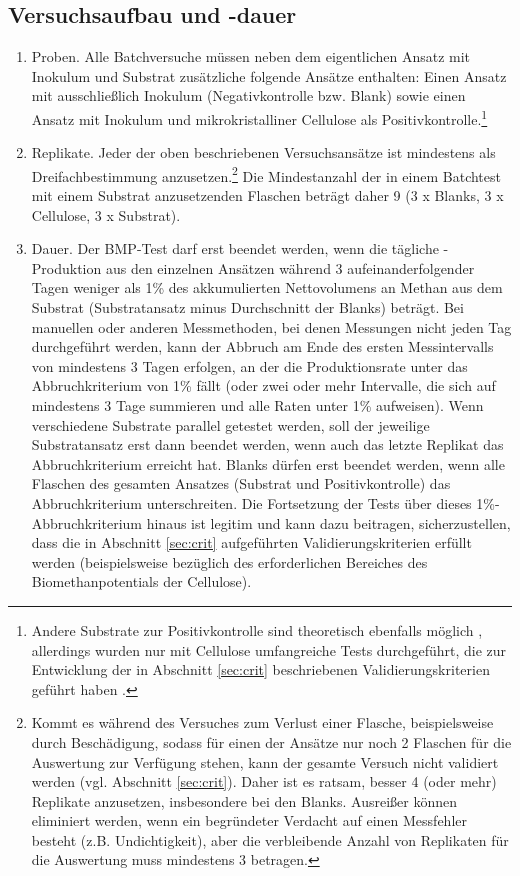 \documentclass[]{article}
\begin{document}
\subsection{Versuchsaufbau und -dauer}
\label{sec:setup}
\begin{enumerate}
  \item Proben. 
    Alle Batchversuche müssen neben dem eigentlichen Ansatz mit Inokulum und Substrat zusätzliche folgende Ansätze enthalten: Einen Ansatz mit ausschließlich Inokulum (Negativkontrolle bzw. Blank) sowie einen Ansatz mit Inokulum und mikrokristalliner Cellulose als Positivkontrolle.\footnote{
      Andere Substrate zur Positivkontrolle sind theoretisch ebenfalls möglich \citep{kochEvaluationCommonSupermarket2020}, allerdings wurden nur mit Cellulose umfangreiche Tests durchgeführt, die zur Entwicklung der in Abschnitt \ref{sec:crit} beschriebenen Validierungskriterien geführt haben
      \citep{hafnerImprovingInterlaboratoryReproducibility2020}.
    }
    \item Replikate. 
    Jeder der oben beschriebenen Versuchsansätze ist mindestens als Dreifachbestimmung anzusetzen.\footnote{
      Kommt es während des Versuches zum Verlust einer Flasche, beispielsweise durch Beschädigung, sodass für einen der Ansätze nur noch 2 Flaschen für die Auswertung zur Verfügung stehen, kann der gesamte Versuch nicht validiert werden (vgl. Abschnitt \ref{sec:crit}).
      Daher ist es ratsam, besser 4 (oder mehr) Replikate anzusetzen, insbesondere bei den Blanks.
      Ausreißer können eliminiert werden, wenn ein begründeter Verdacht auf einen Messfehler besteht (z.B. Undichtigkeit), aber die verbleibende Anzahl von Replikaten für die Auswertung muss mindestens 3 betragen.
    }
    Die Mindestanzahl der in einem Batchtest mit einem Substrat anzusetzenden Flaschen beträgt daher 9 (3 x Blanks, 3 x Cellulose, 3 x Substrat).
  \item Dauer. 
    Der BMP-Test darf erst beendet werden, wenn die tägliche -Produktion aus den einzelnen Ansätzen während 3 aufeinanderfolgender Tagen weniger als 1\% des akkumulierten Nettovolumens an Methan aus dem Substrat (Substratansatz minus Durchschnitt der Blanks) beträgt.
    Bei manuellen oder anderen Messmethoden, bei denen Messungen nicht jeden Tag durchgeführt werden, kann der Abbruch am Ende des ersten Messintervalls von mindestens 3 Tagen erfolgen, an der die Produktionsrate unter das Abbruchkriterium von 1\% fällt (oder zwei oder mehr Intervalle, die sich auf mindestens 3 Tage summieren und alle Raten unter 1\% aufweisen).
    Wenn verschiedene Substrate parallel getestet werden, soll der jeweilige Substratansatz erst dann beendet werden, wenn auch das letzte Replikat das Abbruchkriterium erreicht hat.
    Blanks dürfen erst beendet werden, wenn alle Flaschen des gesamten Ansatzes (Substrat und Positivkontrolle) das Abbruchkriterium unterschreiten.
    Die Fortsetzung der Tests über dieses 1\%-Abbruchkriterium hinaus ist legitim und kann dazu beitragen, sicherzustellen, dass die in Abschnitt \ref{sec:crit} aufgeführten Validierungskriterien erfüllt werden (beispielsweise bezüglich des erforderlichen Bereiches des Biomethanpotentials der Cellulose).
\end{enumerate}
\end{document}
